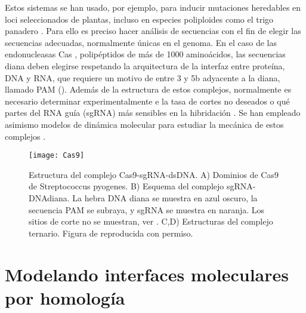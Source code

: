Estos sistemas se han usado, por ejemplo, para inducir mutaciones heredables en loci seleccionados de plantas, incluso en especies poliploides
como el trigo panadero \citep{Wang2014,Lawrenson2015}. 
Para ello es preciso hacer an\'{a}lisis de secuencias con el fin de elegir las secuencias adecuadas, 
normalmente \'{u}nicas en el genoma. 
En el caso de las endonucleasas Cas \citep{Stella2017}, polip\'{e}ptidos de m\'{a}s de 1000 amino\'{a}cidos,
las secuencias diana deben elegirse respetando la arquitectura 
de la interfaz entre prote\'{i}na, DNA y RNA, que requiere un motivo de entre 3 y 5b adyacente a la diana,
llamado PAM (). Adem\'{a}s de la estructura de estos complejos, 
normalmente es necesario determinar experimentalmente  e  la 
tasa de cortes no deseados o qu\'{e} partes del RNA gu\'{i}a (sgRNA) m\'{a}s sensibles en la hibridaci\'{o}n \citep{Cisse2012,Zheng2017}.
Se han empleado asimismo modelos de din\'{a}mica molecular para estudiar la mec\'{a}nica de estos complejos \citep{Zheng2017w}.

\begin{figure}
\begin{center} 
\texttt{[image: Cas9]}
\caption%
{
Estructura del complejo Cas9-sgRNA-dsDNA.
A) Dominios de Cas9 de Streptococcus pyogenes. 
B) Esquema del complejo sgRNA-DNAdiana. La hebra DNA diana se muestra en azul oscuro, la secuencia PAM se subraya, y sgRNA se muestra en naranja. 
Los sitios de corte no se muestran, ver \citet{Stella2017}.
C,D) Estructuras del complejo ternario.
Figura de \cite{Jiang2016} reproducida con permiso.
}
\label{fig:Cas}
\end{center}
\end{figure}




\section{Modelando interfaces moleculares por homolog\'{i}a} \label{dockhom}

